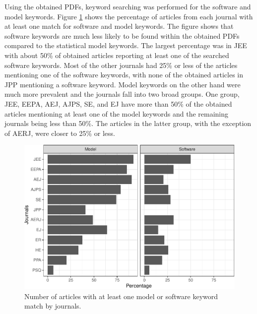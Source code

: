 \documentclass[english,,man]{apa6}
\begin{document}
Using the obtained PDFs, keyword searching was performed for the software and model keywords. Figure \ref{fig:count-software} shows the percentage of articles from each journal with at least one match for software and model keywords. The figure shows that software keywords are much less likely to be found within the obtained PDFs compared to the statistical model keywords. The largest percentage was in JEE with about 50\% of obtained articles reporting at least one of the searched software keywords. Most of the other journals had 25\% or less of the articles mentioning one of the software keywords, with none of the obtained articles in JPP mentioning a software keyword. Model keywords on the other hand were much more prevalent and the journals fall into two broad groups. One group, JEE, EEPA, AEJ, AJPS, SE, and EJ have more than 50\% of the obtained articles mentioning at least one of the model keywords and the remaining journals being less than 50\%. The articles in the latter group, with the exception of AERJ, were closer to 25\% or less.

\begin{figure}
\centering
\includegraphics{software_files/figure-latex/count-software-1.pdf}
\caption{\label{fig:count-software}Number of articles with at least one model or software keyword match by journals.}
\end{figure}
\end{document}
